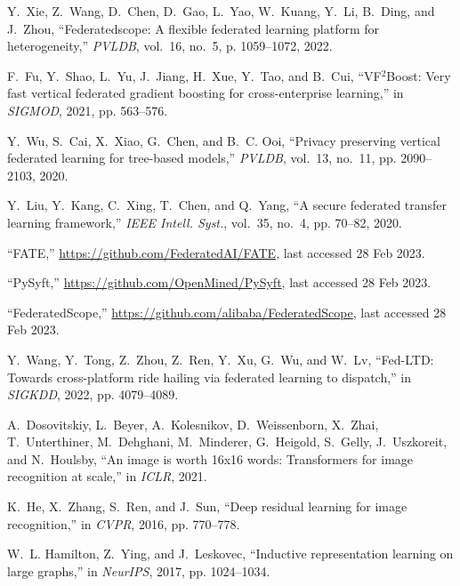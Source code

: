 \documentclass[11pt]{article}
\begin{document}
\begin{thebibliography}{10}
Y.~Xie, Z.~Wang, D.~Chen, D.~Gao, L.~Yao, W.~Kuang, Y.~Li, B.~Ding, and
  J.~Zhou, ``{Federatedscope}: A flexible federated learning platform for
  heterogeneity,'' \emph{{PVLDB}}, vol.~16, no.~5, p. 1059–1072, 2022.

F.~Fu, Y.~Shao, L.~Yu, J.~Jiang, H.~Xue, Y.~Tao, and B.~Cui,
  ``{VF}\({}^{\mbox{2}}\){Boost}: Very fast vertical federated gradient
  boosting for cross-enterprise learning,'' in \emph{{SIGMOD}}, 2021, pp.
  563--576.

Y.~Wu, S.~Cai, X.~Xiao, G.~Chen, and B.~C. Ooi, ``Privacy preserving vertical
  federated learning for tree-based models,'' \emph{{PVLDB}}, vol.~13, no.~11,
  pp. 2090--2103, 2020.

Y.~Liu, Y.~Kang, C.~Xing, T.~Chen, and Q.~Yang, ``A secure federated transfer
  learning framework,'' \emph{{IEEE} Intell. Syst.}, vol.~35, no.~4, pp.
  70--82, 2020.

``{FATE},'' \url{https://github.com/FederatedAI/FATE}, last accessed 28 Feb
  2023.

``{PySyft},'' \url{https://github.com/OpenMined/PySyft}, last accessed 28 Feb
  2023.

``{FederatedScope},'' \url{https://github.com/alibaba/FederatedScope}, last
  accessed 28 Feb 2023.

Y.~Wang, Y.~Tong, Z.~Zhou, Z.~Ren, Y.~Xu, G.~Wu, and W.~Lv, ``{Fed-LTD}:
  Towards cross-platform ride hailing via federated learning to dispatch,'' in
  \emph{{SIGKDD}}, 2022, pp. 4079--4089.

A.~Dosovitskiy, L.~Beyer, A.~Kolesnikov, D.~Weissenborn, X.~Zhai,
  T.~Unterthiner, M.~Dehghani, M.~Minderer, G.~Heigold, S.~Gelly, J.~Uszkoreit,
  and N.~Houlsby, ``An image is worth 16x16 words: Transformers for image
  recognition at scale,'' in \emph{{ICLR}}, 2021.

K.~He, X.~Zhang, S.~Ren, and J.~Sun, ``Deep residual learning for image
  recognition,'' in \emph{{CVPR}}, 2016, pp. 770--778.

W.~L. Hamilton, Z.~Ying, and J.~Leskovec, ``Inductive representation learning
  on large graphs,'' in \emph{{NeurIPS}}, 2017, pp. 1024--1034.


\end{thebibliography}
\end{document}
